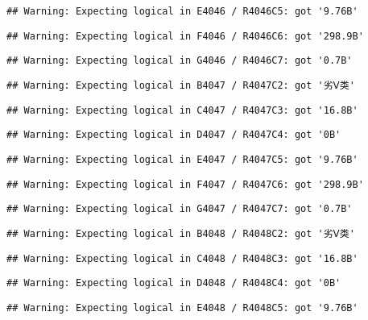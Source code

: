 \documentclass[
]{article}
\begin{document}
\begin{verbatim}
## Warning: Expecting logical in E4046 / R4046C5: got '9.76B'
\end{verbatim}

\begin{verbatim}
## Warning: Expecting logical in F4046 / R4046C6: got '298.9B'
\end{verbatim}

\begin{verbatim}
## Warning: Expecting logical in G4046 / R4046C7: got '0.7B'
\end{verbatim}

\begin{verbatim}
## Warning: Expecting logical in B4047 / R4047C2: got '劣Ⅴ类'
\end{verbatim}

\begin{verbatim}
## Warning: Expecting logical in C4047 / R4047C3: got '16.8B'
\end{verbatim}

\begin{verbatim}
## Warning: Expecting logical in D4047 / R4047C4: got '0B'
\end{verbatim}

\begin{verbatim}
## Warning: Expecting logical in E4047 / R4047C5: got '9.76B'
\end{verbatim}

\begin{verbatim}
## Warning: Expecting logical in F4047 / R4047C6: got '298.9B'
\end{verbatim}

\begin{verbatim}
## Warning: Expecting logical in G4047 / R4047C7: got '0.7B'
\end{verbatim}

\begin{verbatim}
## Warning: Expecting logical in B4048 / R4048C2: got '劣Ⅴ类'
\end{verbatim}

\begin{verbatim}
## Warning: Expecting logical in C4048 / R4048C3: got '16.8B'
\end{verbatim}

\begin{verbatim}
## Warning: Expecting logical in D4048 / R4048C4: got '0B'
\end{verbatim}

\begin{verbatim}
## Warning: Expecting logical in E4048 / R4048C5: got '9.76B'
\end{verbatim}
\end{document}
